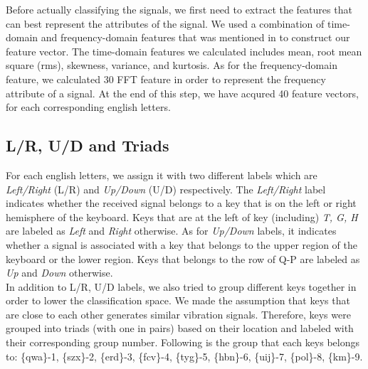 \documentclass[11pt,conference]{IEEEtran}
\begin{document}
Before actually classifying the signals, we first need to extract the features that can best represent the attributes of the signal.  We used a combination of time-domain and frequency-domain features that was mentioned in \cite{spiphone} to construct our feature vector. The time-domain features we calculated includes mean, root mean square (rms), skewness, variance, and kurtosis. As for the frequency-domain feature, we calculated 30 FFT feature in order to represent the frequency attribute of a signal. At the end of this step, we have acqured 40 feature vectors, for each corresponding english letters.

\subsection{L/R, U/D and Triads}
For each english letters, we assign it with two different labels which are \emph{Left/Right} (L/R) and \emph{Up/Down} (U/D) respectively. The \emph{Left/Right} label indicates whether the received signal belongs to a key that is on the left or right hemisphere of the keyboard. Keys that are at the left of key (including) \emph{T, G, H} are labeled as \emph{Left} and \emph{Right} otherwise. As for \emph{Up/Down} labels, it indicates whether a signal is associated with a key that belongs to the upper region of the keyboard or the lower region. Keys that belongs to the row of Q-P are labeled as \emph{Up} and \emph{Down} otherwise.\\

In addition to L/R, U/D labels, we also tried to group different keys together in order to lower the classification space. We made the assumption that keys that are close to each other generates similar vibration signals. Therefore, keys were grouped into triads (with one in pairs) based on their location and labeled with their corresponding group number. Following is the group that each keys belongs to:
\{qwa\}-1, \{szx\}-2, \{erd\}-3, \{fcv\}-4, \{tyg\}-5, \{hbn\}-6, \{uij\}-7, \{pol\}-8, \{km\}-9.
\end{document}
